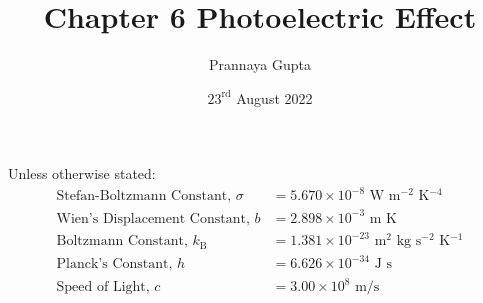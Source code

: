 \documentclass[a4paper, 12pt, addpoints]{exam}
\title{Chapter 6 \textbf{Photoelectric Effect}}
\author{Prannaya Gupta}
\date{$23^{\text{rd}}$ August 2022}
\begin{document}
\maketitle


\begin{tcolorbox}
Unless otherwise stated:
\begin{align*}
\text{Stefan-Boltzmann Constant, }\sigma &= 5.670 \times 10^{-8}\text{ W m${}^{-2}$ K${}^{-4}$} \\
\text{Wien's Displacement Constant, }b &= 2.898 \times 10^{-3} \text{ m K} \\
\text{Boltzmann Constant, }k_\text{B} &= 1.381 \times 10^{-23}\text{ m${}^2$ kg s${}^{-2}$ K${}^{-1}$} \\
\text{Planck's Constant, }h &= 6.626 \times 10^{-34}\text{ J s} \\
\text{Speed of Light, }c &= 3.00 \times 10^8 \text{ m/s}
\end{align*}
\end{tcolorbox}
\newpage
\end{document}
